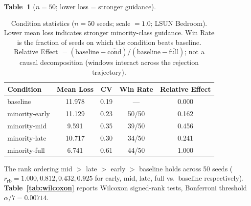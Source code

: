 \documentclass[10pt]{article}
\begin{document}
\textbf{Table~\ref{tab:conditions}} ($n=50$; lower loss = stronger guidance).

\begin{table}[h]
\centering
\caption{Condition statistics ($n=50$ seeds; scale $= 1.0$; LSUN Bedroom).
Lower mean loss indicates stronger minority-class guidance.
Win Rate is the fraction of seeds on which the condition beats baseline.
Relative Effect $= (\text{baseline} - \overline{\text{cond}}) /
(\text{baseline} - \overline{\text{full}})$;
not a causal decomposition (windows interact across the rejection trajectory).}
\label{tab:conditions}
\renewcommand{\arraystretch}{1.1}
\begin{tabular}{@{}lcccc@{}}
\toprule
\textbf{Condition} & \textbf{Mean Loss} & \textbf{CV} &
  \textbf{Win Rate} & \textbf{Relative Effect} \\
\midrule
baseline        & 11.978 & 0.19 & ---   & 0.000 \\
minority-early  & 11.129 & 0.23 & 50/50 & 0.162 \\
minority-mid    &  9.591 & 0.35 & 39/50 & 0.456 \\
minority-late   & 10.717 & 0.30 & 34/50 & 0.241 \\
minority-full   &  6.741 & 0.61 & 44/50 & 1.000 \\
\bottomrule
\end{tabular}
\end{table}

The rank ordering mid $>$ late $>$ early $>$ baseline holds across 50 seeds
($r_\mathrm{rb} = 1.000, 0.812, 0.432, 0.925$ for early, mid, late, full
vs.\ baseline respectively).  \textbf{Table~\ref{tab:wilcoxon}} reports
Wilcoxon signed-rank tests, Bonferroni threshold $\alpha/7 = 0.00714$.
\end{document}
